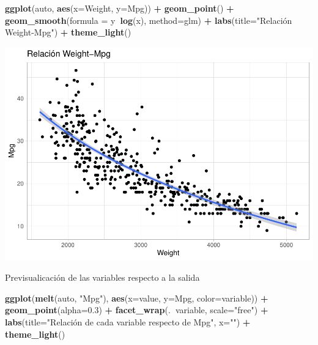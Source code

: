 \documentclass[
]{article}
\newenvironment{Shaded}{\begin{snugshade}}{\end{snugshade}}
\newcommand{\DataTypeTok}[1]{\textcolor[rgb]{0.13,0.29,0.53}{#1}}
\newcommand{\FloatTok}[1]{\textcolor[rgb]{0.00,0.00,0.81}{#1}}
\newcommand{\KeywordTok}[1]{\textcolor[rgb]{0.13,0.29,0.53}{\textbf{#1}}}
\newcommand{\NormalTok}[1]{#1}
\newcommand{\OperatorTok}[1]{\textcolor[rgb]{0.81,0.36,0.00}{\textbf{#1}}}
\newcommand{\StringTok}[1]{\textcolor[rgb]{0.31,0.60,0.02}{#1}}
\begin{document}
\begin{Shaded}
\begin{Highlighting}[]
\KeywordTok{ggplot}\NormalTok{(auto, }\KeywordTok{aes}\NormalTok{(}\DataTypeTok{x=}\NormalTok{Weight, }\DataTypeTok{y=}\NormalTok{Mpg)) }\OperatorTok{+}
\StringTok{  }\KeywordTok{geom_point}\NormalTok{() }\OperatorTok{+}
\StringTok{  }\KeywordTok{geom_smooth}\NormalTok{(}\DataTypeTok{formula =}\NormalTok{ y}\OperatorTok{~}\KeywordTok{log}\NormalTok{(x), }\DataTypeTok{method=}\NormalTok{glm) }\OperatorTok{+}
\StringTok{  }\KeywordTok{labs}\NormalTok{(}\DataTypeTok{title=}\StringTok{"Relación Weight-Mpg"}\NormalTok{) }\OperatorTok{+}
\StringTok{  }\KeywordTok{theme_light}\NormalTok{()}
\end{Highlighting}
\end{Shaded}

\begin{center}\includegraphics{EDA_files/figure-latex/unnamed-chunk-22-2} \end{center}

Previsualicación de las variables respecto a la salida

\begin{Shaded}
\begin{Highlighting}[]
\KeywordTok{ggplot}\NormalTok{(}\KeywordTok{melt}\NormalTok{(auto, }\StringTok{"Mpg"}\NormalTok{), }\KeywordTok{aes}\NormalTok{(}\DataTypeTok{x=}\NormalTok{value, }\DataTypeTok{y=}\NormalTok{Mpg, }\DataTypeTok{color=}\NormalTok{variable)) }\OperatorTok{+}
\StringTok{  }\KeywordTok{geom_point}\NormalTok{(}\DataTypeTok{alpha=}\FloatTok{0.3}\NormalTok{) }\OperatorTok{+}
\StringTok{  }\KeywordTok{facet_wrap}\NormalTok{(.}\OperatorTok{~}\NormalTok{variable, }\DataTypeTok{scale=}\StringTok{"free"}\NormalTok{) }\OperatorTok{+}
\StringTok{  }\KeywordTok{labs}\NormalTok{(}\DataTypeTok{title=}\StringTok{"Relación de cada variable respecto de Mpg"}\NormalTok{, }\DataTypeTok{x=}\StringTok{""}\NormalTok{) }\OperatorTok{+}
\StringTok{  }\KeywordTok{theme_light}\NormalTok{()}
\end{Highlighting}
\end{Shaded}
\end{document}
